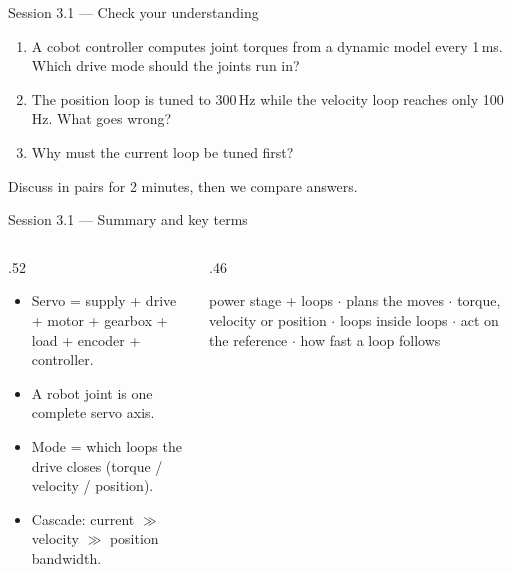 \documentclass[aspectratio=169,10pt]{beamer}
\begin{document}
\begin{frame}{Session 3.1 --- Check your understanding}
\begin{keybox}
\begin{enumerate}\setlength\itemsep{2mm}
\item A cobot controller computes joint torques from a dynamic model every 1\,ms. Which drive mode should the joints run in?
\item The position loop is tuned to 300\,Hz while the velocity loop reaches only 100\,Hz. What goes wrong?
\item Why must the current loop be tuned first?
\end{enumerate}
\end{keybox}
\vspace{2mm}
{\small\color{mkGray}Discuss in pairs for 2 minutes, then we compare answers.}
\end{frame}

\begin{frame}{Session 3.1 --- Summary and key terms}
\begin{columns}[T]
\begin{column}{.52\textwidth}
\begin{keybox}
\begin{itemize}\setlength\itemsep{.4mm}
\item Servo = supply + drive + motor + gearbox + load + encoder + controller.
\item A robot joint is one complete servo axis.
\item Mode = which loops the drive closes (torque / velocity / position).
\item Cascade: current $\gg$ velocity $\gg$ position bandwidth.
\end{itemize}
\end{keybox}
\end{column}
\begin{column}{.46\textwidth}
\begin{defbox}
\small
{} power stage + loops $\cdot$  plans the moves $\cdot$  torque, velocity or position $\cdot$  loops inside loops $\cdot$  act on the reference $\cdot$  how fast a loop follows
\end{defbox}
\end{column}
\end{columns}
\end{frame}
\end{document}
